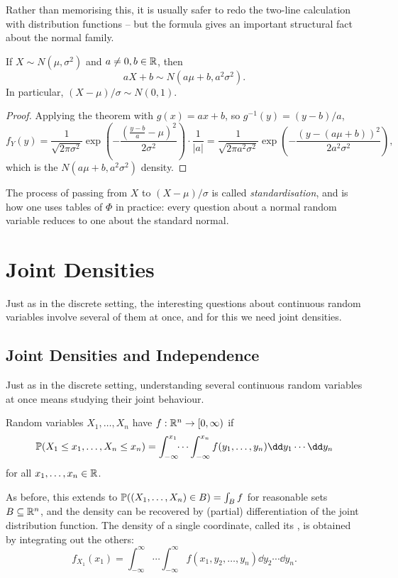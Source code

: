 \documentclass[a4paper]{scrartcl}
\begin{document}
Rather than memorising this, it is usually safer to redo the two-line calculation with distribution functions -- but the formula gives an important structural fact about the normal family.

\begin{corollary}
	If $X \sim N(\mu, \sigma^2)$ and $a \neq 0, b \in \mathbb{R}$, then
	$$
	aX + b \sim N(a\mu + b, a^2\sigma^2).
	$$
	In particular, $(X - \mu)/\sigma \sim N(0,1)$.
\end{corollary}
\begin{proof}
	Applying the theorem with $g(x) = ax + b$, so $g^{-1}(y) = (y - b)/a$,
	$$
	f_Y(y) = \frac{1}{\sqrt{2\pi\sigma^2}}\exp\left(-\frac{(\frac{y - b}{a} - \mu)^2}{2\sigma^2}\right)\cdot\frac{1}{|a|} = \frac{1}{\sqrt{2\pi a^2\sigma^2}}\exp\left(-\frac{(y - (a\mu + b))^2}{2a^2\sigma^2}\right),
	$$
	which is the $N(a\mu + b, a^2\sigma^2)$ density.
\end{proof}

The process of passing from $X$ to $(X - \mu)/\sigma$ is called \emph{standardisation}, and is how one uses tables of $\Phi$ in practice: every question about a normal random variable reduces to one about the standard normal.


\section{Joint Densities}

Just as in the discrete setting, the interesting questions about continuous random variables involve several of them at once, and for this we need joint densities.

\subsection{Joint Densities and Independence}

Just as in the discrete setting, understanding several continuous random variables at once means studying their joint behaviour.

\begin{definition}
	Random variables $X_1, \dots, X_n$ have  $f: \mathbb{R}^n \rightarrow [0, \infty)$ if
	$$
	\PP(X_1 \leq x_1, \dots, X_n \leq x_n) = \int_{-\infty}^{x_1} \!\!\cdots \int_{-\infty}^{x_n} f(y_1, \dots, y_n) \dd y_1 \cdots \dd y_n
	$$
	for all $x_1, \dots, x_n \in \mathbb{R}$.
\end{definition}

As before, this extends to $\mathbb{P}((X_1, \dots, X_n) \in B) = \int_B f$ for reasonable sets $B \subseteq \mathbb{R}^n$, and the density can be recovered by (partial) differentiation of the joint distribution function. The density of a single coordinate, called its , is obtained by integrating out the others:
$$
f_{X_1}(x_1) = \int_{-\infty}^{\infty}\!\!\cdots\int_{-\infty}^{\infty} f(x_1, y_2, \dots, y_n) \dd y_2 \cdots \dd y_n.
$$
\end{document}
